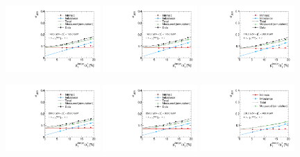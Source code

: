 \begin{figure}[ht]
 \centering
    \includegraphics[width=0.32\textwidth]{figures/resolution/results/JER_for_3_eta_bin_6_pTGamma_bin_all_contributions_PFCHS_RMS99_mc.pdf}
    \includegraphics[width=0.32\textwidth]{figures/resolution/results/JER_for_3_eta_bin_7_pTGamma_bin_all_contributions_PFCHS_RMS99_mc.pdf}
    \includegraphics[width=0.32\textwidth]{figures/resolution/results/JER_for_3_eta_bin_8_pTGamma_bin_all_contributions_PFCHS_RMS99_mc.pdf}

    \includegraphics[width=0.32\textwidth]{figures/resolution/results/JER_for_3_eta_bin_9_pTGamma_bin_all_contributions_PFCHS_RMS99_mc.pdf}
    \includegraphics[width=0.32\textwidth]{figures/resolution/results/JER_for_3_eta_bin_10_pTGamma_bin_all_contributions_PFCHS_RMS99_mc.pdf}
    \includegraphics[width=0.32\textwidth]{figures/resolution/results/JER_for_3_eta_bin_11_pTGamma_bin_all_contributions_PFCHS_RMS99_mc.pdf}


\end{figure}
